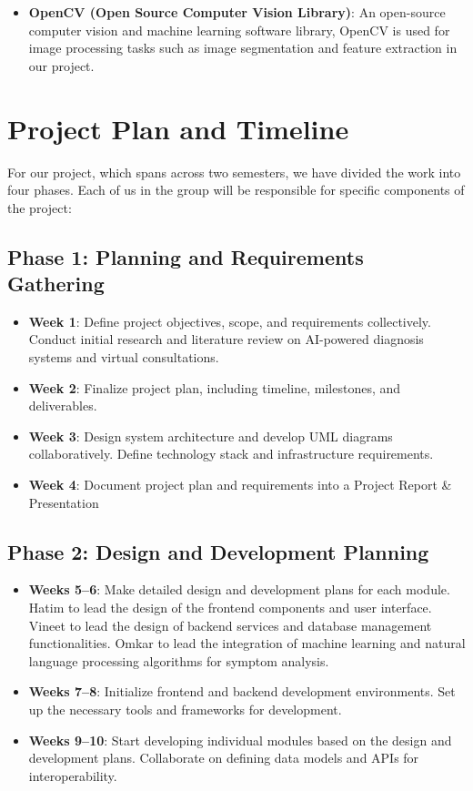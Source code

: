 \documentclass[onecolumn]{article}
\begin{document}
\begin{itemize}
\item \textbf{OpenCV (Open Source Computer Vision Library)}: An open-source computer vision and machine learning software library, OpenCV is used for image processing tasks such as image segmentation and feature extraction in our project.
\end{itemize}

\section{Project Plan and Timeline}
For our project, which spans across two semesters, we have divided the work into four phases. Each of us in the group will be responsible for specific components of the project:

\subsection{Phase 1: Planning and Requirements Gathering}
\begin{itemize}
\item \textbf{Week 1}: Define project objectives, scope, and requirements collectively. Conduct initial research and literature review on AI-powered diagnosis systems and virtual consultations.
\item \textbf{Week 2}: Finalize project plan, including timeline, milestones, and deliverables.
\item \textbf{Week 3}: Design system architecture and develop UML diagrams collaboratively. Define technology stack and infrastructure requirements.
\item \textbf{Week 4}:  Document project plan and requirements into a Project Report \& Presentation
\end{itemize}

\subsection{Phase 2: Design and Development Planning}
\begin{itemize}
\item \textbf{Weeks 5–6}: Make detailed design and development plans for each module. Hatim to lead the design of the frontend components and user interface. Vineet to lead the design of backend services and database management functionalities. Omkar to lead the integration of machine learning and natural language processing algorithms for symptom analysis.
\item \textbf{Weeks 7–8}: Initialize frontend and backend development environments. Set up the necessary tools and frameworks for development.
\item \textbf{Weeks 9–10}: Start developing individual modules based on the design and development plans. Collaborate on defining data models and APIs for interoperability.
\end{itemize}
\end{document}
